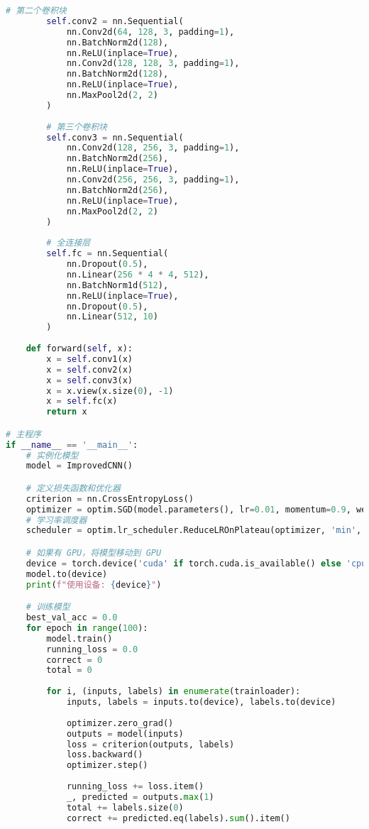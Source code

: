 \documentclass[UTF8]{report}
\theoremstyle{MyLineTheoremStyle} %
\theoremstyle{MyBlockTheoremStyle} %
\theoremstyle{MySubsubsectionStyle} %
\begin{document}
\begin{lstlisting}[language=python, caption={神经网络CNN训练（纯手写第一版）}, label={lst:cnn_train_handwritten}]
        # 第二个卷积块
        self.conv2 = nn.Sequential(
            nn.Conv2d(64, 128, 3, padding=1),
            nn.BatchNorm2d(128),
            nn.ReLU(inplace=True),
            nn.Conv2d(128, 128, 3, padding=1),
            nn.BatchNorm2d(128),
            nn.ReLU(inplace=True),
            nn.MaxPool2d(2, 2)
        )
        
        # 第三个卷积块
        self.conv3 = nn.Sequential(
            nn.Conv2d(128, 256, 3, padding=1),
            nn.BatchNorm2d(256),
            nn.ReLU(inplace=True),
            nn.Conv2d(256, 256, 3, padding=1),
            nn.BatchNorm2d(256),
            nn.ReLU(inplace=True),
            nn.MaxPool2d(2, 2)
        )
        
        # 全连接层
        self.fc = nn.Sequential(
            nn.Dropout(0.5),
            nn.Linear(256 * 4 * 4, 512),
            nn.BatchNorm1d(512),
            nn.ReLU(inplace=True),
            nn.Dropout(0.5),
            nn.Linear(512, 10)
        )
        
    def forward(self, x):
        x = self.conv1(x)
        x = self.conv2(x)
        x = self.conv3(x)
        x = x.view(x.size(0), -1)
        x = self.fc(x)
        return x

# 主程序
if __name__ == '__main__':
    # 实例化模型
    model = ImprovedCNN()

    # 定义损失函数和优化器
    criterion = nn.CrossEntropyLoss()
    optimizer = optim.SGD(model.parameters(), lr=0.01, momentum=0.9, weight_decay=5e-4)
    # 学习率调度器
    scheduler = optim.lr_scheduler.ReduceLROnPlateau(optimizer, 'min', factor=0.1, patience=5, verbose=True)

    # 如果有 GPU，将模型移动到 GPU
    device = torch.device('cuda' if torch.cuda.is_available() else 'cpu')
    model.to(device)
    print(f"使用设备: {device}")

    # 训练模型
    best_val_acc = 0.0
    for epoch in range(100):
        model.train()
        running_loss = 0.0
        correct = 0
        total = 0
        
        for i, (inputs, labels) in enumerate(trainloader):
            inputs, labels = inputs.to(device), labels.to(device)
            
            optimizer.zero_grad()
            outputs = model(inputs)
            loss = criterion(outputs, labels)
            loss.backward()
            optimizer.step()
            
            running_loss += loss.item()
            _, predicted = outputs.max(1)
            total += labels.size(0)
            correct += predicted.eq(labels).sum().item()
            

\end{lstlisting}
\end{document}
